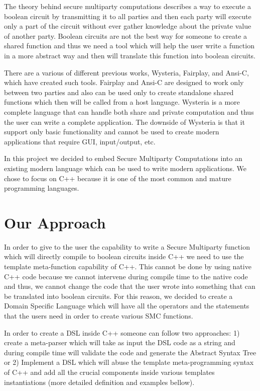 \documentclass[paper=a4, fontsize=11pt]{scrartcl} %
\numberwithin{equation}{section} %
\numberwithin{figure}{section} %
\numberwithin{table}{section} %
\begin{document}
The theory behind secure multiparty computations describes a way to execute a boolean circuit by transmitting it to all parties and then each party will execute only a part of the circuit without ever gather knowledge about the private value of another party. Boolean circuits are not the best way for someone to create a shared function and thus we need a tool which will help the user write a function in a more abstract way and then will translate this function into boolean circuits.

There are a various of different previous works, Wysteria, Fairplay, and Ansi-C, which have created such tools. Fairplay and Ansi-C are designed to work only between two parties and also can be used only to create standalone shared functions which then will be called from a host language. Wysteria is a more complete language that can handle both share and private computation and thus the user can write a complete application. The downside of Wysteria is that it support only basic functionality and cannot be used to create modern applications that require GUI, input/output, etc.

In this project we decided to embed Secure Multiparty Computations into an existing modern language which can be used to write modern applications. We chose to focus on C++ because it is one of the most common and mature programming languages.

\section{Our Approach}
In order to give to the user the capability to write a Secure Multiparty function which will directly compile to boolean circuits inside C++ we need to use the template meta-function capability of C++. This cannot be done by using native C++ code because we cannot intervene during compile time to the native code and thus, we cannot change the code that the user wrote into something that can be translated into boolean circuits. For this reason, we decided to create a Domain Specific Language which will have all the operators and the statements that the users need in order to create various SMC functions. 

In order to create a DSL inside C++ someone can follow two approaches: 1) create a meta-parser which will take as input the DSL code as a string and during compile time will validate the code and generate the Abstract Syntax Tree or 2) Implement a DSL which will abuse the template meta-programming syntax of C++ and add all the crucial components inside various templates instantiations (more detailed definition and examples bellow).
\end{document}
